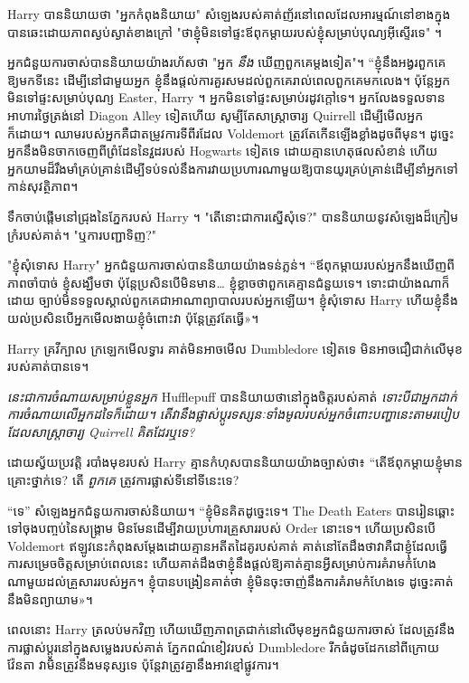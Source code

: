 {Harry បាននិយាយថា "អ្នកកំពុងនិយាយ" សំឡេងរបស់គាត់ញ័រនៅពេលដែលអារម្មណ៍នៅខាងក្នុងបានឆេះដោយភាពស្ងប់ស្ងាត់ខាងក្រៅ "ថាខ្ញុំមិនទៅផ្ទះឪពុកម្តាយរបស់ខ្ញុំសម្រាប់បុណ្យអ៊ីស្ទើរទេ" ។

អ្នកជំនួយការចាស់បាននិយាយយ៉ាងរហ័សថា "អ្នក \emph{នឹង} ឃើញពួកគេម្តងទៀត"។ “ខ្ញុំនឹងអង្វរពួកគេឱ្យមកទីនេះ ដើម្បីនៅជាមួយអ្នក ខ្ញុំនឹងផ្តល់ការគួរសមដល់ពួកគេរាល់ពេលពួកគេមកលេង។ ប៉ុន្តែអ្នកមិនទៅផ្ទះសម្រាប់បុណ្យ Easter, Harry ។ អ្នកមិនទៅផ្ទះសម្រាប់រដូវក្តៅទេ។ អ្នកលែងទទួលទានអាហារថ្ងៃត្រង់នៅ Diagon Alley ទៀតហើយ សូម្បីតែសាស្រ្តាចារ្យ Quirrell ដើម្បីមើលអ្នកក៏ដោយ។ ឈាមរបស់អ្នកគឺជាតម្រូវការទីពីរដែល Voldemort ត្រូវតែកើនឡើងខ្លាំងដូចពីមុន។ ដូច្នេះ អ្នកនឹងមិនចាកចេញពីព្រំដែននៃវួដរបស់ Hogwarts ទៀតទេ ដោយគ្មានហេតុផលសំខាន់ ហើយអ្នកយាមដ៏រឹងមាំគ្រប់គ្រាន់ដើម្បីទប់ទល់នឹងការវាយប្រហារណាមួយឱ្យបានយូរគ្រប់គ្រាន់ដើម្បីនាំអ្នកទៅកាន់សុវត្ថិភាព។

ទឹកចាប់ផ្តើមនៅជ្រុងនៃភ្នែករបស់ Harry ។ "តើនោះជាការស្នើសុំទេ?" បាន​និយាយ​នូវ​សំឡេង​ដ៏​ក្រៀមក្រំ​របស់​គាត់។ "ឬការបញ្ជាទិញ?"

"ខ្ញុំសុំទោស Harry" អ្នកជំនួយការចាស់បាននិយាយយ៉ាងទន់ភ្លន់។ “ឪពុកម្តាយរបស់អ្នកនឹងឃើញពីភាពចាំបាច់ ខ្ញុំសង្ឃឹមថា ប៉ុន្តែប្រសិនបើមិនមាន… ខ្ញុំខ្លាចថាពួកគេគ្មានជំនួយទេ។ ទោះ​ជា​យ៉ាង​ណា​ក៏​ដោយ ច្បាប់​មិន​ទទួល​ស្គាល់​ពួក​គេ​ជា​អាណាព្យាបាល​របស់​អ្នក​ឡើយ។ ខ្ញុំសុំទោស Harry ហើយខ្ញុំនឹងយល់ប្រសិនបើអ្នកមើលងាយខ្ញុំចំពោះវា ប៉ុន្តែត្រូវតែធ្វើ»។

Harry គ្រវីក្បាល ក្រឡេកមើលទ្វារ គាត់មិនអាចមើល Dumbledore ទៀតទេ មិនអាចជឿជាក់លើមុខរបស់គាត់បានទេ។

\emph{នេះជាការចំណាយសម្រាប់ខ្លួនអ្នក} Hufflepuff បាននិយាយថានៅក្នុងចិត្តរបស់គាត់ \emph{ទោះបីជាអ្នកដាក់ការចំណាយលើអ្នកដទៃក៏ដោយ។ តើ​វា​នឹង​ផ្លាស់ប្តូរ​ទស្សនៈ​ទាំងមូល​របស់អ្នក​ចំពោះ​បញ្ហា​នេះ​តាម​របៀប​ដែល​សាស្ត្រាចារ្យ Quirrell គិត​ដែរឬទេ?}

ដោយ​ស្វ័យ​ប្រវត្តិ របាំង​មុខ​របស់ Harry គ្មាន​កំហុស​បាន​និយាយ​យ៉ាង​ច្បាស់​ថា​៖ “តើ​ឪពុក​ម្តាយ​ខ្ញុំ​មាន​គ្រោះ​ថ្នាក់​ទេ? តើ \emph{ពួកគេ} ត្រូវការផ្លាស់ទីនៅទីនេះទេ?

“ទេ” សំឡេង​អ្នក​ជំនួយការ​ចាស់​និយាយ។ “ខ្ញុំមិនគិតដូច្នេះទេ។ The Death Eaters បានរៀនឆ្ពោះទៅចុងបញ្ចប់នៃសង្រ្គាម មិនមែនដើម្បីវាយប្រហារគ្រួសាររបស់ Order នោះទេ។ ហើយប្រសិនបើ Voldemort ឥឡូវនេះកំពុងសម្តែងដោយគ្មានអតីតដៃគូរបស់គាត់ គាត់នៅតែដឹងថាវាគឺជាខ្ញុំដែលធ្វើការសម្រេចចិត្តសម្រាប់ពេលនេះ ហើយគាត់ដឹងថាខ្ញុំនឹងផ្តល់ឱ្យគាត់គ្មានអ្វីសម្រាប់ការគំរាមកំហែងណាមួយដល់គ្រួសាររបស់អ្នក។ ខ្ញុំ​បាន​បង្រៀន​គាត់​ថា ខ្ញុំ​មិន​ចុះ​ចាញ់​នឹង​ការ​គំរាម​កំហែង​ទេ ដូច្នេះ​គាត់​នឹង​មិន​ព្យាយាម»។

ពេលនោះ Harry ត្រលប់មកវិញ ហើយឃើញភាពត្រជាក់នៅលើមុខអ្នកជំនួយការចាស់ ដែលត្រូវនឹងការផ្លាស់ប្តូរនៅក្នុងសម្លេងរបស់គាត់ ភ្នែកពណ៌ខៀវរបស់ Dumbledore រីកធំដូចដែកនៅពីក្រោយវ៉ែនតា វាមិនត្រូវនឹងមនុស្សទេ ប៉ុន្តែវាត្រូវគ្នានឹងអាវខ្មៅផ្លូវការ។

}
